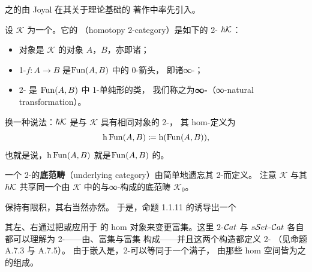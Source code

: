 \trQuasiCategory{}之\trInfinityCosmos{}的\trHomotopyTwoCategory{}由 Joyal 在其关于\trQuasiCategory{}理论基础的
著作中率先引入\cite{bib63}。

\begin{definition}[\trHomotopyTwoCategory]\label{def:homotopy-2-category}
设 $\mathcal{K}$ 为一个\trInfinityCosmos{}。它的%
\textbf{\trHomotopyTwoCategory}（homotopy 2-category）是如下的 2-\trCategory
$\hbar \mathcal{K}$：
\begin{itemize}
\item 对象是 $\mathcal{K}$ 的对象 $A$，$B$，亦即诸\trInfinityCategory{}；
\item 1-\trCell $f\colon A\to B$ 是\trFunctorSpace $\operatorname{Fun}(A,B)$ 中的 0-箭头，
  即诸∞-\trFunctor{}；
\item 2-\trCell {}
  是 $\operatorname{Fun}(A,B)$ 中 1-单纯形的\trHomotopy{}类，
  我们称之为\textbf{∞-\trNaturalTransformation}（∞-natural transformation）。
\end{itemize}
\end{definition}

换一种说法：$\hbar \mathcal{K}$ 是与 $\mathcal{K}$ 具有相同对象的 2-\trCategory{}，
其 hom-\trCategory{}定义为
\begin{equation*}
\mathrm{h}\operatorname{Fun}(A,B)\coloneqq\mathrm{h}(\operatorname{Fun}(A,B)),
\end{equation*}
也就是说，$\mathrm{h}\operatorname{Fun}(A,B)$ 就是\trQuasiCategory $\operatorname{Fun}(A,B)$ 的\trHomotopyCategory{}。

一个 2-\trCategory{}的\textbf{底范畴}（underlying category）由简单地遗忘其 2-\trCell{}而定义。
注意\trInfinityCosmos{} $\mathcal{K}$ 与其\trHomotopyTwoCategory $\hbar \mathcal{K}$
共享同一个由 $\mathcal{K}$ 中的\trInfinityCategory{}与∞-\trFunctor{}构成的底范畴 $\mathcal{K}_0$。

\begin{digression}[\trChangeOfBase{}，附录 A.7]\label{dig:change-of-base}
\trHomotopyCategory\trFunctor{}保持有限积，其右\trAdjunction{}当然亦然。
于是，命题 1.1.11 的\trAdjunction{}诱导出一个\trChangeOfBase\trAdjunction
\begin{center}
\end{center}
其左、右\trAdjunction{}通过把\trHomotopyCategory\trFunctor{}或\trNerve\trFunctor{}应用于%
\trEnrichedCategory{}的 hom 对象来变更富集。这里 $2$-$\mathcal{C}at$ 与 $s\mathcal{S}et$-$\mathcal{C}at$
各自都可以理解为 2-\trCategory——由\trEnrichedCategory{}、富集\trFunctor{}与富集%
\trNaturalTransformation{}构成——并且这两个\trChangeOfBase{}构造都定义 2-\trFunctor
（见命题 A.7.3 与 A.7.5）。%
由于\trNerve{}嵌入是\trFullyFaithful，2-\trCategory{}可以等同于一个满子\trCategory{}，
由那些 hom 空间皆为\trCategory{}之\trNerve{}的\trSimplicialCategory{}组成。
\end{digression}

